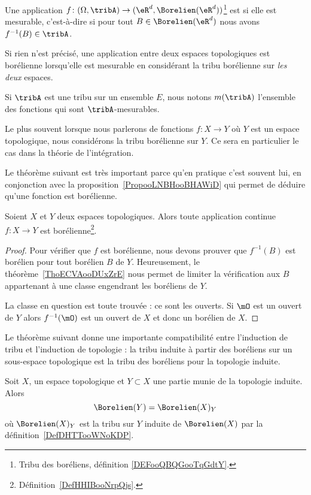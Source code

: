 \begin{definition}     \label{DefHHIBooNrpQjs}
	Une application \( f\colon (\Omega,\tribA)\to (\eR^d,\Borelien(\eR^d))\)\footnote{Tribu des boréliens, définition \ref{DEFooQBQGooTqGdtY}.} est  si elle est mesurable, c'est-à-dire si pour tout \( B\in\Borelien(\eR^d)\) nous avons \( f^{-1}(B)\in\tribA\).

	Si rien n'est précisé, une application entre deux espaces topologiques est borélienne lorsqu'elle est mesurable en considérant la tribu borélienne sur \emph{les deux} espaces.
\end{definition}
Si \( \tribA\) est une tribu sur un ensemble \( E\), nous notons \( m(\tribA)\) l'ensemble des fonctions qui sont \( \tribA\)-mesurables.

Le plus souvent lorsque nous parlerons de fonctions \( f\colon X\to Y\) où \( Y\) est un espace topologique, nous considérons la tribu borélienne sur \( Y\). Ce sera en particulier le cas dans la théorie de l'intégration.

Le théorème suivant est très important parce qu'en pratique c'est souvent lui, en conjonction avec la proposition~\ref{PropooLNBHooBHAWiD} qui permet de déduire qu'une fonction est borélienne.
\begin{theorem}     \label{ThoJDOKooKaaiJh}
	Soient \( X\) et \( Y\) deux espaces topologiques. Alors toute application continue \( f\colon X\to Y\) est borélienne\footnote{Définition~\ref{DefHHIBooNrpQjs}.}.
\end{theorem}

\begin{proof}
	Pour vérifier que \( f\) est borélienne, nous devons prouver que \( f^{-1}(B)\) est borélien pour tout borélien \( B\) de \( Y\). Heureusement, le théorème~\ref{ThoECVAooDUxZrE} nous permet de limiter la vérification aux \( B\) appartenant à une classe engendrant les boréliens de \( Y\).

	La classe en question est toute trouvée : ce sont les ouverts. Si \( \mO\) est un ouvert de \( Y\) alors \( f^{-1}(\mO)\) est un ouvert de \( X\) et donc un borélien de \( X\).
\end{proof}

Le théorème suivant donne une importante compatibilité entre l'induction de tribu et l'induction de topologie : la tribu induite à partir des boréliens sur un sous-espace topologique est la tribu des boréliens pour la topologie induite.
\begin{theorem}     \label{ThoSVTHooChgvYa}
	Soit \( X\), un espace topologique et \( Y\subset X\) une partie munie de la topologie induite. Alors
	\begin{equation}
		\Borelien(Y)=\Borelien(X)_Y
	\end{equation}
	où \( \Borelien(X)_Y\) est la tribu sur \( Y\) induite de \( \Borelien(X)\) par la définition~\ref{DefDHTTooWNoKDP}.
\end{theorem}

